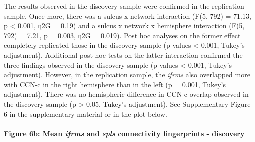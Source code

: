 \documentclass[
]{article}
\begin{document}
The results observed in the discovery sample were confirmed in the
replication sample. Once more, there was a sulcus x network interaction
(F(5, 792) = 71.13, p \textless{} 0.001, η2G = 0.19) and a sulcus x
network x hemisphere interaction (F(5, 792) = 7.21, p = 0.003, η2G =
0.019). Post hoc analyses on the former effect completely replicated
those in the discovery sample (p-values \textless{} 0.001, Tukey's
adjustment). Additional post hoc tests on the latter interaction
confirmed the three findings observed in the discovery sample (p-values
\textless{} 0.001, Tukey's adjustment). However, in the replication
sample, the \emph{ifrms} also overlapped more with CCN-c in the right
hemisphere than in the left (p = 0.001, Tukey's adjustment). There was
no hemispheric difference in CCN-c overlap observed in the discovery
sample (p \textgreater{} 0.05, Tukey's adjustment). See Supplementary
Figure 6 in the supplementary material or in the plot below.

\hypertarget{figure-6b-mean-ifrms-and-spls-connectivity-fingerprints---discovery}{%
\paragraph{\texorpdfstring{Figure 6b: Mean \emph{ifrms} and \emph{spls}
connectivity fingerprints -
discovery}{Figure 6b: Mean ifrms and spls connectivity fingerprints - discovery}}\label{figure-6b-mean-ifrms-and-spls-connectivity-fingerprints---discovery}}
\end{document}
